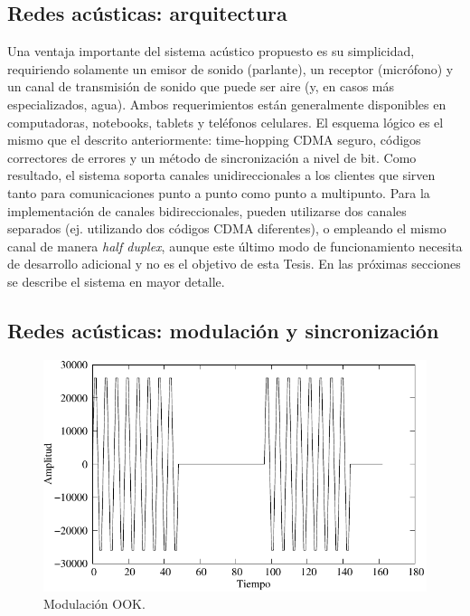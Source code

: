 \subsection{Redes acústicas: arquitectura}

Una ventaja importante del sistema acústico propuesto es su simplicidad, requiriendo solamente un emisor de sonido (parlante), un receptor (micrófono) y un canal de transmisión de sonido que puede ser aire (y, en casos más especializados, agua). Ambos requerimientos están generalmente disponibles en computadoras, notebooks, tablets y teléfonos celulares. 
El esquema lógico es el mismo que el descrito anteriormente: time-hopping CDMA seguro, códigos correctores de errores y un método de sincronización a nivel de bit.
Como resultado, el sistema soporta canales unidireccionales a los clientes que sirven tanto para comunicaciones punto a punto como punto a multipunto. 
Para la implementación de canales bidireccionales, pueden utilizarse dos canales separados (ej. utilizando dos códigos CDMA diferentes), o empleando el mismo canal de manera \textit{half duplex}, aunque este último modo de funcionamiento necesita de desarrollo adicional y no es el objetivo de esta Tesis.
En las próximas secciones se describe el sistema en mayor detalle.

\subsection{Redes acústicas: modulación y sincronización}
\begin{figure}[t]
  \centering
    \includegraphics[width=5in]{graphs/modulated.pdf}
    \caption{Modulación OOK.}
    \label{arch:ook}
\end{figure}


